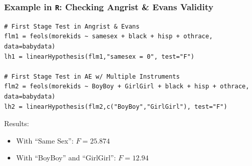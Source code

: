 \documentclass[aspectratio=169,11pt]{beamer}
\begin{document}
\begin{frame}[fragile]\frametitle{Example in \texttt{R}: Checking Angrist \& Evans Validity}
\begin{lstlisting}[frame=single]
# First Stage Test in Angrist & Evans
flm1 = feols(morekids ~ samesex + black + hisp + othrace, data=babydata)
lh1 = linearHypothesis(flm1,"samesex = 0", test="F")

# First Stage Test in AE w/ Multiple Instruments
flm2 = feols(morekids ~ BoyBoy + GirlGirl + black + hisp + othrace, data=babydata)
lh2 = linearHypothesis(flm2,c("BoyBoy","GirlGirl"), test="F")
\end{lstlisting}

\vspace{3mm}
	Results:
\begin{itemize}
	\item With ``Same Sex'': $F = 25.874$
	\item With ``BoyBoy'' and ``GirlGirl'': $F = 12.94$
\end{itemize}
\end{frame}
\end{document}
